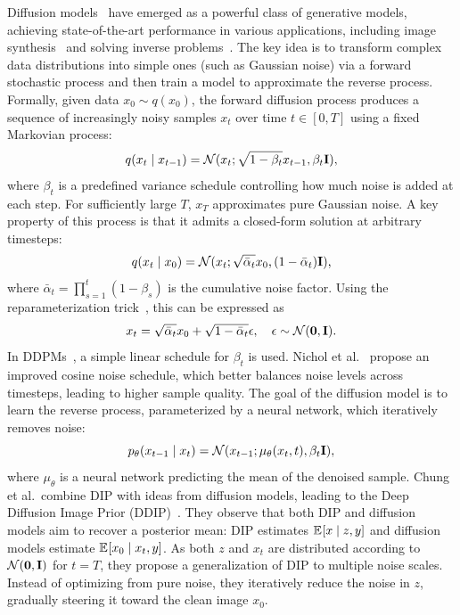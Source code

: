 Diffusion models~\cite{Diffusion} have emerged as a powerful class of generative models, achieving state-of-the-art performance in various applications, including image synthesis~\cite{LDM} and solving inverse problems~\cite{DDRM}.
The key idea is to transform complex data distributions into simple ones (such as Gaussian noise) via a forward stochastic process and then train a model to approximate the reverse process.
Formally, given data $x_0 \sim q(x_0)$, the forward diffusion process produces a sequence of increasingly noisy samples $x_t$ over time $t \in [0,T]$ using a fixed Markovian process:
\begin{equation}
    q(x_t \mid x_{t-1}) = \mathcal{N}(x_t;\sqrt{1 - \beta_t} x_{t-1},\beta_t \mathbf{I}),
\end{equation}
where $\beta_t$ is a predefined variance schedule controlling how much noise is added at each step. For sufficiently large $T$, $x_T$ approximates pure Gaussian noise.
A key property of this process is that it admits a closed-form solution at arbitrary timesteps:
\begin{equation}
    q(x_t \mid x_0) = \mathcal{N}(x_t;\sqrt{\bar{\alpha}_t} x_0,(1-\bar{\alpha}_t) \mathbf{I}),
\end{equation}
where $\bar{\alpha}_t = \prod_{s=1}^{t} (1 - \beta_s)$ is the cumulative noise factor.
Using the reparameterization trick~\cite{VAE}, this can be expressed as
\begin{equation}
    x_t = \sqrt{\bar{\alpha}_t}x_0 + \sqrt{1-\bar{\alpha}_t}\epsilon, \quad \epsilon \sim \mathcal{N}(\mathbf{0},\mathbf{I}).
\end{equation}
In DDPMs~\cite{DDPM}, a simple linear schedule for $\beta_t$ is used. Nichol et al.~\cite{IDDPM} propose an improved cosine noise schedule, which better balances noise levels across timesteps, leading to higher sample quality.
The goal of the diffusion model is to learn the reverse process, parameterized by a neural network, which iteratively removes noise:
\begin{equation}
    p_\theta(x_{t-1} \mid x_t) = \mathcal{N}(x_{t-1};\mu_\theta(x_t, t),\beta_t \mathbf{I}),
\end{equation}
where $\mu_\theta$ is a neural network predicting the mean of the denoised sample.
\newpage
Chung et al.\ combine DIP with ideas from diffusion models, leading to the Deep Diffusion Image Prior (DDIP)~\cite{DDIP}.
They observe that both DIP and diffusion models aim to recover a posterior mean:
DIP estimates $\mathbb{E}_{ } [x \mid z,y]$ and diffusion models estimate $\mathbb{E}_{ } [x_0 \mid x_t,y]$.
As both $z$ and $x_t$ are distributed according to $\mathcal{N}(\mathbf{0},\mathbf{I})$ for $t=T$, they propose a generalization of DIP to multiple noise scales. Instead of optimizing from pure noise, they iteratively reduce the noise in $z$, gradually steering it toward the clean image $x_0$.
